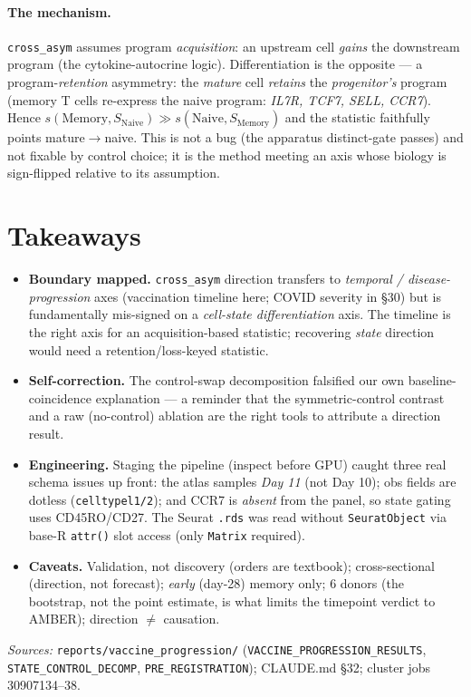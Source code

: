 \documentclass[11pt]{article}
\begin{document}
\paragraph{The mechanism.} \texttt{cross\_asym} assumes program \emph{acquisition}: an upstream
cell \emph{gains} the downstream program (the cytokine-autocrine logic). Differentiation is the
opposite --- a program-\emph{retention} asymmetry: the \emph{mature} cell \emph{retains} the
\emph{progenitor's} program (memory T cells re-express the naive program: \textit{IL7R, TCF7,
SELL, CCR7}). Hence $s(\text{Memory},S_{\text{Naive}})\gg s(\text{Naive},S_{\text{Memory}})$ and
the statistic faithfully points mature$\rightarrow$naive. This is not a bug (the apparatus
distinct-gate passes) and not fixable by control choice; it is the method meeting an axis whose
biology is sign-flipped relative to its assumption.

\section{Takeaways}
\begin{itemize}[leftmargin=1.4em,itemsep=1pt]
\item \textbf{Boundary mapped.} \texttt{cross\_asym} direction transfers to \emph{temporal /
disease-progression} axes (vaccination timeline here; COVID severity in \S30) but is
fundamentally mis-signed on a \emph{cell-state differentiation} axis. The timeline is the right
axis for an acquisition-based statistic; recovering \emph{state} direction would need a
retention/loss-keyed statistic.
\item \textbf{Self-correction.} The control-swap decomposition falsified our own
baseline-coincidence explanation --- a reminder that the symmetric-control contrast and a raw
(no-control) ablation are the right tools to attribute a direction result.
\item \textbf{Engineering.} Staging the pipeline (inspect before GPU) caught three real schema
issues up front: the atlas samples \emph{Day 11} (not Day 10); obs fields are dotless
(\texttt{celltypel1/2}); and CCR7 is \emph{absent} from the panel, so state gating uses
CD45RO/CD27. The Seurat \texttt{.rds} was read without \texttt{SeuratObject} via base-R
\texttt{attr()} slot access (only \texttt{Matrix} required).
\item \textbf{Caveats.} Validation, not discovery (orders are textbook); cross-sectional
(direction, not forecast); \emph{early} (day-28) memory only; 6 donors (the bootstrap, not the
point estimate, is what limits the timepoint verdict to AMBER); direction $\neq$ causation.
\end{itemize}

\vspace{2pt}\noindent\footnotesize\textit{Sources:}
\texttt{reports/vaccine\_progression/} (\texttt{VACCINE\_PROGRESSION\_RESULTS},
\texttt{STATE\_CONTROL\_DECOMP}, \texttt{PRE\_REGISTRATION}); CLAUDE.md \S32; cluster jobs
30907134--38.
\end{document}
